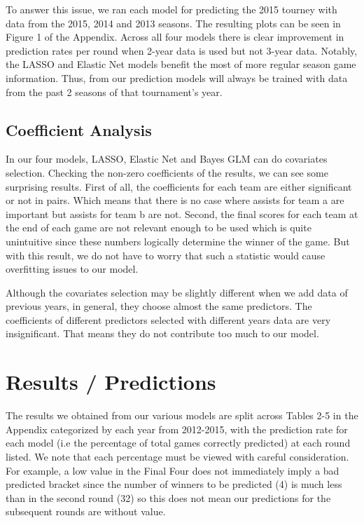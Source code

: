 \documentclass{article} %
\begin{document}
To answer this issue, we ran each model for predicting the 2015 tourney with data from the 2015, 2014 and 2013 seasons. The resulting plots can be seen in Figure 1 of the Appendix. Across all four models there is clear improvement in prediction rates per round when 2-year data is used but not 3-year data. Notably, the LASSO and Elastic Net models benefit the most of more regular season game information. Thus, from our prediction models will always be trained with data from the past 2 seasons of that tournament's year.

\subsection{Coefficient Analysis}

In our four models, LASSO, Elastic Net and Bayes GLM can do covariates selection. Checking the non-zero coefficients of the results, we can see some surprising results. First of all, the coefficients for each team are either significant or not in pairs. Which means that there is no case where assists for team a are important but assists for team b are not. Second, the final scores for each team at the end of each game are not relevant enough to be used which is quite unintuitive since these numbers logically determine the winner of the game. But with this result, we do not have to worry that such a statistic would cause overfitting issues to our model.\

Although the covariates selection may be slightly different when we add data of previous years, in general, they choose almost the same predictors. The coefficients of different predictors selected with different years data are very insignificant. That means they do not contribute too much to our model.\

\section{Results / Predictions}

The results we obtained from our various models are split across Tables 2-5 in the Appendix categorized by each year from 2012-2015, with the prediction rate for each model (i.e the percentage of total games correctly predicted) at each round listed. We note that each percentage must be viewed with careful consideration. For example, a low value in the Final Four does not immediately imply a bad predicted bracket since the number of winners to be predicted (4) is much less than in the second round (32) so this does not mean our predictions for the subsequent rounds are without value.
\end{document}
